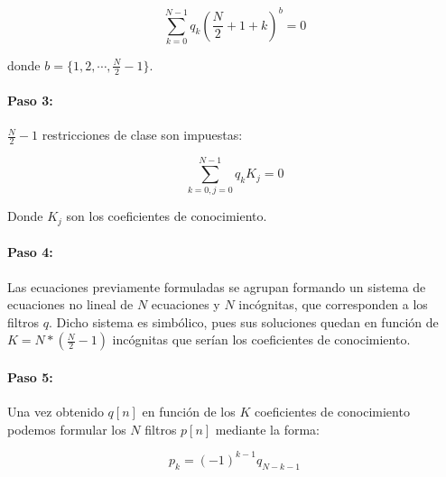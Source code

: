 \documentclass[11pt]{article}
\begin{document}
\begin{equation}
    \sum_{k=0}^{N - 1} q_{k}(\frac{N}{2} + 1 + k)^b = 0
\end{equation}

donde \(b = \{1, 2, \cdots, \frac{N}{2} - 1\}\).

\paragraph*{Paso 3:}
\(\frac{N}{2} - 1\) restricciones de clase son impuestas:

\begin{equation}
    \sum_{k=0, j=0}^{N - 1} q_{k}K_{j} = 0
\end{equation}

Donde \(K_{j}\) son los coeficientes de conocimiento.

\paragraph*{Paso 4:}
Las ecuaciones previamente formuladas se agrupan formando un sistema de ecuaciones no lineal de \(N\) ecuaciones y \(N\) incógnitas, que corresponden a 
los filtros \(q\). Dicho sistema es simbólico, pues sus soluciones quedan en función de \(K = N * (\frac{N}{2} - 1)\) 
incógnitas que serían los coeficientes de conocimiento.

\paragraph*{Paso 5:}
Una vez obtenido \(q[n]\) en función de los \(K\) coeficientes de conocimiento podemos formular 
los \(N\) filtros \(p[n]\) mediante la forma:

\begin{equation}
    p_{k} = (-1)^{k-1}q_{N - k - 1}
\end{equation}

\end{document}
